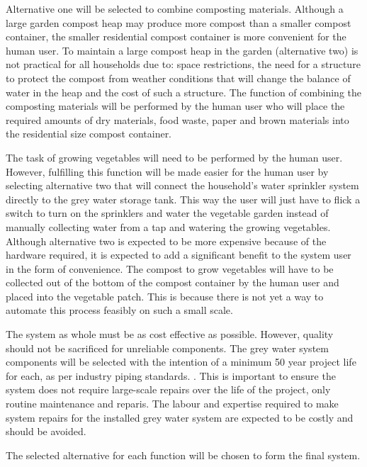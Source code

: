 \documentclass[a4paper,11pt,fleqn]{report}
\begin{document}
Alternative one will be selected to combine composting materials. Although a large garden compost heap may produce more compost than a smaller compost container, the smaller residential compost container is more convenient for the human user. To maintain a large compost heap in the garden (alternative two) is not practical for all households due to: space restrictions, the need for a structure to protect the compost from weather conditions that will change the balance of water in the heap and the cost of such a structure. The function of combining the composting materials will be performed by the human user who will place the required amounts of dry materials, food waste, paper and brown materials into the residential size compost container.

The task of growing vegetables will need to be performed by the human user. However, fulfilling this function will be made easier for the human user by selecting alternative two that will connect the household's water sprinkler system directly to the grey water storage tank. This way the user will just have to flick a switch to turn on the sprinklers and water the vegetable garden instead of manually collecting water from a tap and watering the growing vegetables. Although alternative two is expected to be more expensive because of the hardware required, it is expected to add a significant benefit to the system user in the form of convenience. The compost to grow vegetables will have to be collected out of the bottom of the compost container by the human user and placed into the vegetable patch. This is because there is not yet a way to automate this process feasibly on such a small scale.

The system as whole must be as cost effective as possible. However, quality should not be sacrificed for unreliable components. The grey water system components will be selected with the intention of a minimum 50 year project life for each, as per industry piping standards. \citep{Fischer2012}. This is important to ensure the system does not require large-scale repairs over the life of the project, only routine maintenance and reparis. The labour and expertise required to make system repairs for the installed grey water system are expected to be costly and should be avoided.

The selected alternative for each function will be chosen to form the final system.
\end{document}
